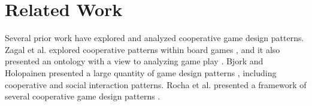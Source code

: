 \section{Related Work}




Several prior work have explored and analyzed cooperative game design patterns. Zagal et al. explored cooperative patterns within board games \cite{CG1}, and it also presented an ontology with a view to analyzing game play \cite{CG3}. 
Bjork and Holopainen presented a large quantity of game design patterns \cite{CG2}, including cooperative and social interaction patterns.
Rocha et al. presented a framework of several cooperative game design patterns \cite{CG4}.


